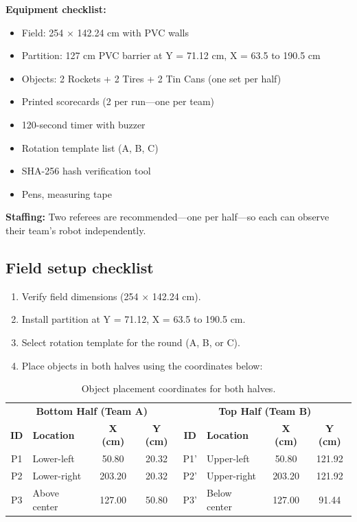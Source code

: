 \documentclass[a4]{article}
\begin{document}
\textbf{Equipment checklist:}
\begin{itemize}[nosep]
    \item Field: 254 $\times$ 142.24 cm with PVC walls
    \item Partition: 127 cm PVC barrier at Y = 71.12 cm, X = 63.5 to 190.5 cm
    \item Objects: 2 Rockets + 2 Tires + 2 Tin Cans (one set per half)
    \item Printed scorecards (2 per run---one per team)
    \item 120-second timer with buzzer
    \item Rotation template list (A, B, C)
    \item SHA-256 hash verification tool
    \item Pens, measuring tape
\end{itemize}

\textbf{Staffing:} Two referees are recommended---one per half---so each can observe their team's robot independently.

\subsection*{Field setup checklist}

\begin{enumerate}
    \item Verify field dimensions (254 $\times$ 142.24 cm).
    \item Install partition at Y = 71.12, X = 63.5 to 190.5 cm.
    \item Select rotation template for the round (A, B, or C).
    \item Place objects in both halves using the coordinates below:
\end{enumerate}

\begin{table}[H]
\centering
\begin{tabular}{clcc|clcc}
\toprule
\multicolumn{4}{c|}{\textbf{Bottom Half (Team A)}} & \multicolumn{4}{c}{\textbf{Top Half (Team B)}} \\
\textbf{ID} & \textbf{Location} & \textbf{X (cm)} & \textbf{Y (cm)} & \textbf{ID} & \textbf{Location} & \textbf{X (cm)} & \textbf{Y (cm)} \\
\midrule
P1 & Lower-left & 50.80 & 20.32 & P1' & Upper-left & 50.80 & 121.92 \\
P2 & Lower-right & 203.20 & 20.32 & P2' & Upper-right & 203.20 & 121.92 \\
P3 & Above center & 127.00 & 50.80 & P3' & Below center & 127.00 & 91.44 \\
\bottomrule
\end{tabular}
\caption{Object placement coordinates for both halves.}
\end{table}
\end{document}
